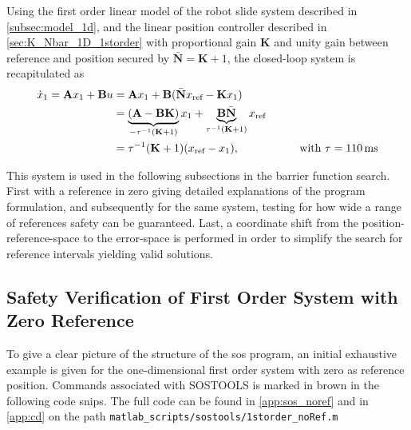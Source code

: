 Using the first order linear model of the robot slide system described in \autoref{subsec:model_1d}, and  the linear position controller described in \autoref{sec:K_Nbar_1D_1storder} with proportional gain \textbf{K} and unity gain between reference and position secured by $\bar{\mathbf{N}}=\textbf{K}+1$, %
the closed-loop system is recapitulated as
\vspace{-1mm}
\begin{align}
\dot{x}_1 = \textbf{A}x_1+\textbf{B}u &= \textbf{A}x_1+\textbf{B}(\bar{\mathbf{N}}x_\text{ref}-\textbf{K}x_1)\nonumber\\
&= \underbrace{(\textbf{A} - \textbf{B}\textbf{K})}_{-\tau^{-1}(\textbf{K}+1)} x_1 + \underbrace{\textbf{B}\bar{\textbf{N}}}_{\tau^{-1}(\textbf{K}+1)} x_\text{ref} \nonumber\\
& = %
\tau^{-1}(\mathbf{K}+1)(x_\text{ref}-x_1),
\kk\kk\mm \text{with }\tau=110\,\text{ms}\label{eq:sos_firstorder}
\end{align}


This system is used in the following subsections in the barrier function search.
First with a reference in zero giving detailed explanations of the program formulation, and subsequently for the same system, testing for how wide a range of references safety can be guaranteed. Last, a coordinate shift from the position-reference-space to the error-space is performed in order to simplify the search for reference intervals yielding valid solutions.

\subsection{Safety Verification of First Order System with Zero Reference}\label{subsec:zeroref}
To give a clear picture of the structure of the \gls{sos} program, an initial exhaustive example is given for the  one-dimensional first order system with zero as reference position. Commands associated with SOSTOOLS is marked in brown in the following code snips. The full code can be found in \autoref{app:sos_noref} and in \autoref{app:cd} on the path \texttt{matlab\_scripts/sostools/1storder\_noRef.m}


